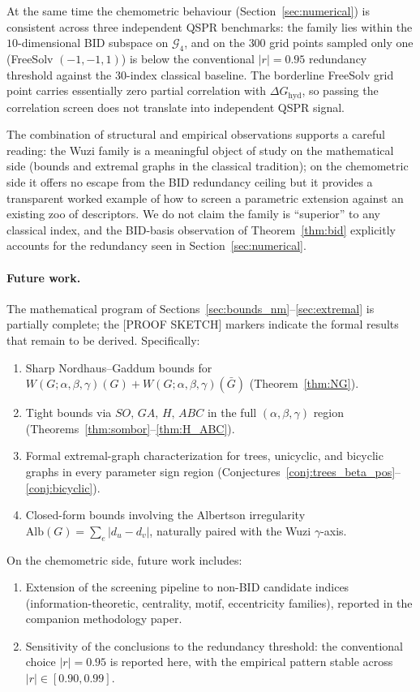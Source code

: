 \documentclass[11pt,a4paper]{article}
\theoremstyle{definition}
\newcommand{\Wuzi}{W(G;\alpha,\beta,\gamma)}
\begin{document}
At the same time the chemometric behaviour
(Section~\ref{sec:numerical}) is consistent across three
independent QSPR benchmarks: the family lies within the $10$-dimensional
BID subspace on $\mathcal{G}_4$, and on the $300$ grid points sampled
only one (FreeSolv $(-1,-1,1)$) is below the conventional $|r|=0.95$
redundancy threshold against the $30$-index classical baseline.
The borderline FreeSolv grid point carries essentially zero partial
correlation with $\Delta G_{\mathrm{hyd}}$, so passing the
correlation screen does not translate into independent QSPR signal.

The combination of structural and empirical observations supports a
careful reading: the Wuzi family is a meaningful object of study on
the mathematical side (bounds and extremal graphs in the
classical tradition); on the chemometric side it offers no escape
from the BID redundancy ceiling but it provides a transparent
worked example of how to screen a parametric extension against an
existing zoo of descriptors. We do not claim the family is
``superior'' to any classical index, and the BID-basis observation
of Theorem~\ref{thm:bid} explicitly accounts for the redundancy
seen in Section~\ref{sec:numerical}.

\paragraph{Future work.} The mathematical program of
Sections~\ref{sec:bounds_nm}--\ref{sec:extremal} is partially
complete; the [PROOF SKETCH] markers indicate the formal results
that remain to be derived. Specifically:
\begin{enumerate}
\item Sharp Nordhaus--Gaddum bounds for $\Wuzi(G)+\Wuzi(\bar G)$
(Theorem~\ref{thm:NG}).
\item Tight bounds via $SO,\,GA,\,H,\,ABC$ in the full
$(\alpha,\beta,\gamma)$ region (Theorems~\ref{thm:sombor}--\ref{thm:H_ABC}).
\item Formal extremal-graph characterization for trees, unicyclic,
and bicyclic graphs in every parameter sign region
(Conjectures~\ref{conj:trees_beta_pos}--\ref{conj:bicyclic}).
\item Closed-form bounds involving the Albertson irregularity
$\mathrm{Alb}(G)=\sum_e|d_u-d_v|$, naturally paired with the
Wuzi $\gamma$-axis.
\end{enumerate}

On the chemometric side, future work includes:
\begin{enumerate}
\item Extension of the screening pipeline to non-BID candidate
indices (information-theoretic, centrality, motif, eccentricity
families), reported in the companion methodology paper.
\item Sensitivity of the conclusions to the redundancy threshold:
the conventional choice $|r|=0.95$ is reported here, with the
empirical pattern stable across $|r|\in[0.90, 0.99]$.
\end{enumerate}
\end{document}
